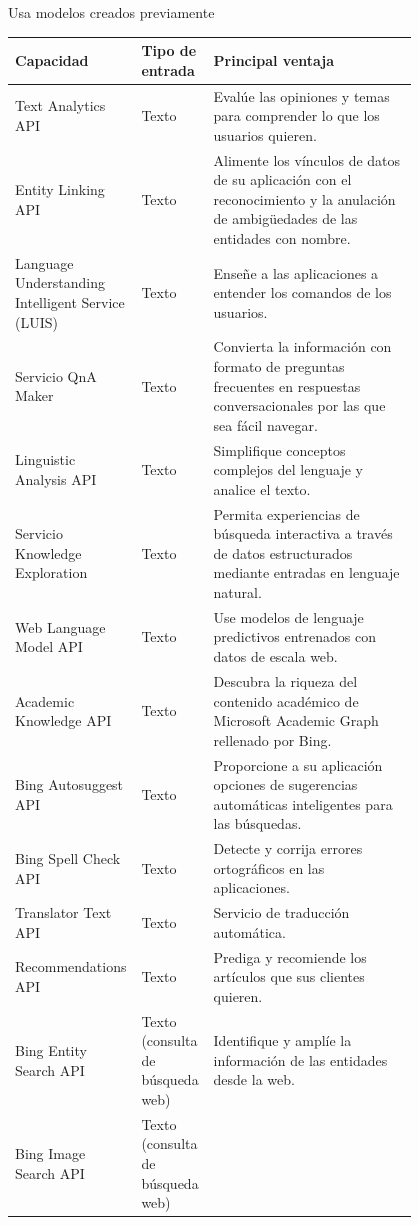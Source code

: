 Usa modelos creados previamente
\begin{table}[]
\begin{tabular}{| p{0.15\linewidth} | p{0.15\linewidth} | p{0.5\linewidth} |}
\hline
\textbf{Capacidad} &
  \textbf{Tipo de entrada} &
  \textbf{Principal ventaja} \\ \hline
Text Analytics API &
  Texto &
  Evalúe las opiniones y temas para comprender lo que los usuarios quieren. \\ \hline
Entity Linking API &
  Texto &
  Alimente los vínculos de datos de su aplicación con el reconocimiento y la anulación de ambigüedades de las entidades con nombre. \\ \hline
Language Understanding Intelligent Service (LUIS) &
  Texto &
  Enseñe a las aplicaciones a entender los comandos de los usuarios. \\ \hline
Servicio QnA Maker &
  Texto &
  Convierta la información con formato de preguntas frecuentes en respuestas conversacionales por las que sea fácil navegar. \\ \hline
Linguistic Analysis API &
  Texto &
  Simplifique conceptos complejos del lenguaje y analice el texto. \\ \hline
Servicio Knowledge Exploration &
  Texto &
  Permita experiencias de búsqueda interactiva a través de datos estructurados mediante entradas en lenguaje natural. \\ \hline
Web Language Model API &
  Texto &
  Use modelos de lenguaje predictivos entrenados con datos de escala web. \\ \hline
Academic Knowledge API &
  Texto &
  Descubra la riqueza del contenido académico de Microsoft Academic Graph rellenado por Bing. \\ \hline
Bing Autosuggest API &
  Texto &
  Proporcione a su aplicación opciones de sugerencias automáticas inteligentes para las búsquedas. \\ \hline
Bing Spell Check API &
  Texto &
  Detecte y corrija errores ortográficos en las aplicaciones. \\ \hline
Translator Text API &
  Texto &
  Servicio de traducción automática. \\ \hline
Recommendations API &
  Texto &
  Prediga y recomiende los artículos que sus clientes quieren. \\ \hline
Bing Entity Search API &
  Texto (consulta de búsqueda web) &
  Identifique y amplíe la información de las entidades desde la web. \\ \hline
Bing Image Search API &
  Texto (consulta de búsqueda web) &

\end{tabular}
\end{table}
